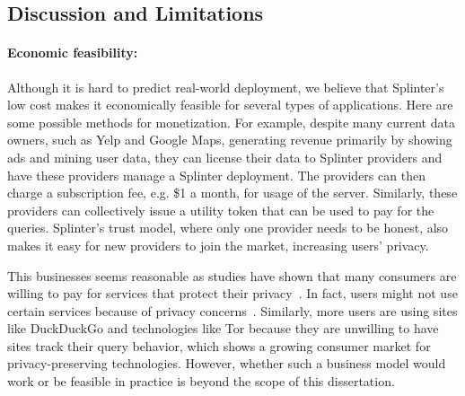 \subsection{Discussion and Limitations}
\label{spl-sec:discussion}

\paragraph{Economic feasibility:}
\label{sec:disc-economics}

Although it is hard to predict real-world deployment, we believe that Splinter's low cost makes it economically feasible for several types of applications.
Here are some possible methods for monetization.
For example, despite many current data owners, such as Yelp and Google Maps, generating revenue primarily by showing ads and mining user data,
they can license their data to Splinter providers and have these providers manage a Splinter deployment. The providers
can then charge a subscription fee, e.g. \$1 a month, for usage of the server.
Similarly, these providers can collectively issue a utility token that
can be used to pay for the queries.
Splinter's trust model, where only one provider needs to be honest, also makes 
it easy for new providers to join the market, increasing users' privacy.

This businesses seems reasonable as studies have shown that 
many consumers are willing to pay for services that protect their privacy~\cite{atlantic,atlantic2}. 
In fact, users might not use certain services because of privacy concerns~\cite{ravichandran2009capturing,riley2008tolls}.
Similarly, more users are using sites like DuckDuckGo and technologies like Tor 
because they are unwilling to have sites track their
query behavior, which shows a growing consumer market for privacy-preserving technologies. 
However, whether such a business model would work or be feasible 
in practice is beyond the scope of this dissertation.


